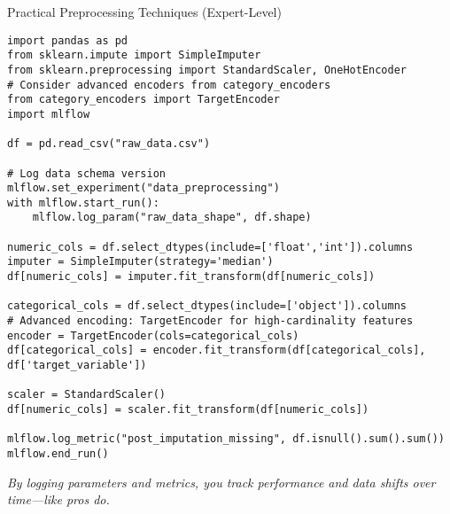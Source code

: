 \documentclass[aspectratio=169]{beamer}
\begin{document}
\begin{frame}{Practical Preprocessing Techniques (Expert-Level)}
\begin{verbatim}
import pandas as pd
from sklearn.impute import SimpleImputer
from sklearn.preprocessing import StandardScaler, OneHotEncoder
# Consider advanced encoders from category_encoders
from category_encoders import TargetEncoder
import mlflow

df = pd.read_csv("raw_data.csv")

# Log data schema version
mlflow.set_experiment("data_preprocessing")
with mlflow.start_run():
    mlflow.log_param("raw_data_shape", df.shape)

numeric_cols = df.select_dtypes(include=['float','int']).columns
imputer = SimpleImputer(strategy='median')
df[numeric_cols] = imputer.fit_transform(df[numeric_cols])

categorical_cols = df.select_dtypes(include=['object']).columns
# Advanced encoding: TargetEncoder for high-cardinality features
encoder = TargetEncoder(cols=categorical_cols)
df[categorical_cols] = encoder.fit_transform(df[categorical_cols], df['target_variable'])

scaler = StandardScaler()
df[numeric_cols] = scaler.fit_transform(df[numeric_cols])

mlflow.log_metric("post_imputation_missing", df.isnull().sum().sum())
mlflow.end_run()
\end{verbatim}

\emph{By logging parameters and metrics, you track performance and data shifts over time—like pros do.}
\end{frame}
\end{document}

